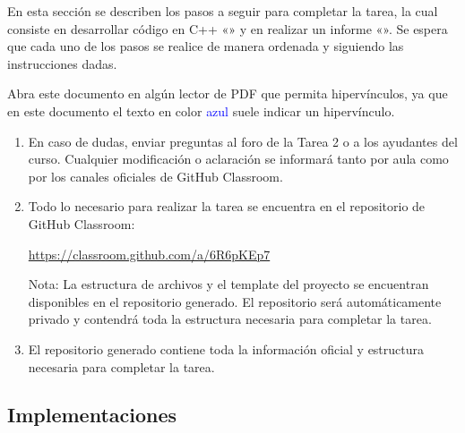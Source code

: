 En esta sección se describen los pasos a seguir para completar la tarea, la cual consiste en desarrollar código
en C++ «» y en realizar un informe «». Se espera que cada
uno de los pasos se realice de manera ordenada y siguiendo las instrucciones dadas.

\begin{mdframed}
    Abra este documento en algún lector de PDF que permita hipervínculos, ya que en este documento el texto en
    color \textcolor{blue}{azul} suele indicar un hipervínculo.
\end{mdframed}

\begin{enumerate}[(1)]
    \item En caso de dudas, enviar preguntas al foro de la Tarea 2 o a los ayudantes del curso. 
    Cualquier modificación o aclaración se informará tanto por aula como por los canales oficiales de GitHub Classroom.

    \item Todo lo necesario para realizar la tarea se encuentra en el repositorio de GitHub Classroom: 
    \begin{center}
        \url{https://classroom.github.com/a/6R6pKEp7}
    \end{center}
    Nota: La estructura de archivos y el template del proyecto se encuentran disponibles en el repositorio generado. 
    El repositorio será automáticamente privado y contendrá toda la estructura necesaria para completar la tarea.

    \item El repositorio generado contiene toda la información oficial y estructura necesaria para completar la tarea.

\end{enumerate}

\subsection{Implementaciones} \label{subsec:implementations}


